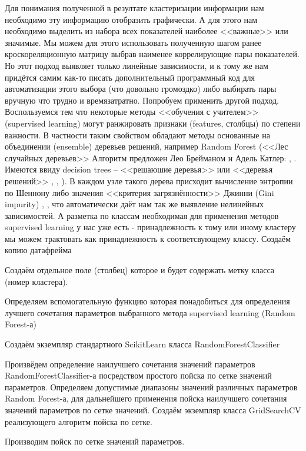 \documentclass[11pt]{article}
\begin{document}
    Для понимания полученной в резултате кластеризации информации нам
необходимо эту информацию отобразить графически. А для этого нам
необходимо выделить из набора всех показателей наиболее <<важные>>
или значимые. Мы можем для этого использовать полученную шагом ранее
кроскореляционную матрицу выбрав наименее коррелирующие пары
показателей. Но этот подход выявляет только линейные зависимости, и к
тому же нам придётся самим как-то писать дополнительный программный код
для автоматизации этого выбора (что довольно громоздко) либо выбирать
пары вручную что трудно и времязатратно. Попробуем применить другой
подход. Воспользуемся тем что некоторые методы
<<обучения с учителем>> (supervised learning) могут ранжировать
признаки (features, столбцы) по степени важности. В частности таким
свойством обладают методы основанные на объединении (ensemble) деревьев
решений, например Random Forest (<<Лес случайных деревьев>>
Алгоритм предложен Лео Брейманом и Адель Катлер: \cite{litlink4},
\cite{litlink1} \cite{litlink5} \cite{litlink7}. Имеются ввиду decision
trees -- <<решаюшие деревья>> или <<деревья решений>>
\cite{litlink1}, \cite{litlink5} \cite{litlink6}, \cite{litlink7}). В
каждом узле такого дерева присходит вычисление энтропии по Шеннону либо
значения <<критерия загрязнённости>> Джинни (Gini impurity)
\cite{litlink3} \cite{litlink5}, \cite{litlink7}, что автоматически даёт
нам так же выявление нелинейных зависимостей. А разметка по классам
необходимая для применения методов supervised learning у нас уже есть -
принадлежность к тому или иному кластеру мы можем трактовать как
принадлежность к соответсвующему классу. Создаём копию датафрейма

    Создаём отдельное поле (столбец) которое и будет содержать метку класса
(номер кластера).

    Определяем вспомогательную функцию которая понадобиться для определения
лучшего сочетания параметров выбранного метода supervised learning
(Random Forest-а)

    Создаём экземпляр стандартного ScikitLearn класса RandomForestClassifier

    Произвёдем определение наилучшего сочетания значений параметров
RandomForestClassifier-а посредством простого пойска по сетке значений
параметров. Определяем допустимые диапазоны значений различных
параметров Random Forest-а, для дальнейшего применения пойска наилучшего
сочетания значений параметров по сетке значений. Создаём экземпляр
класса GridSearchCV реализующего алгоритм пойска по сетке.

    Производим пойск по сетке значений параметров.
\end{document}
